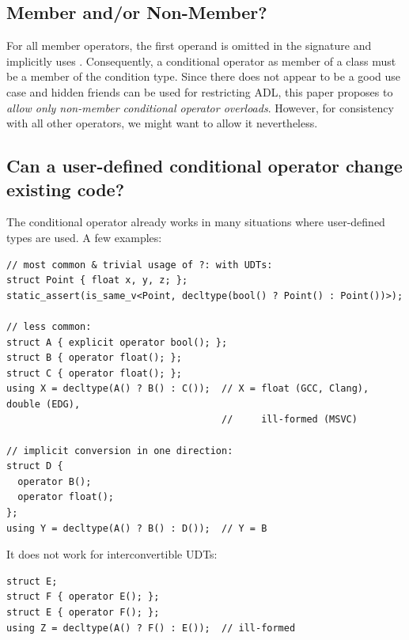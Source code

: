 
\subsection{Member and/or Non-Member?}

For all member operators, the first operand is omitted in the signature and implicitly uses .
Consequently, a conditional operator as member of a class must be a member of the condition type.
Since there does not appear to be a good use case and hidden friends can be used for restricting ADL, this paper proposes to \emph{allow only non-member conditional operator overloads}.
However, for consistency with all other operators, we might want to allow it nevertheless.

\subsection{Can a user-defined conditional operator change existing code?}

The conditional operator already works in many situations where user-defined types are used.
A few examples:
\medskip\begin{lstlisting}
// most common & trivial usage of ?: with UDTs:
struct Point { float x, y, z; };
static_assert(is_same_v<Point, decltype(bool() ? Point() : Point())>);

// less common:
struct A { explicit operator bool(); };
struct B { operator float(); };
struct C { operator float(); };
using X = decltype(A() ? B() : C());  // X = float (GCC, Clang), double (EDG),
                                      //     ill-formed (MSVC)

// implicit conversion in one direction:
struct D {
  operator B();
  operator float();
};
using Y = decltype(A() ? B() : D());  // Y = B
\end{lstlisting}

It does not work for interconvertible UDTs:
\medskip\begin{lstlisting}
struct E;
struct F { operator E(); };
struct E { operator F(); };
using Z = decltype(A() ? F() : E());  // ill-formed
\end{lstlisting}

